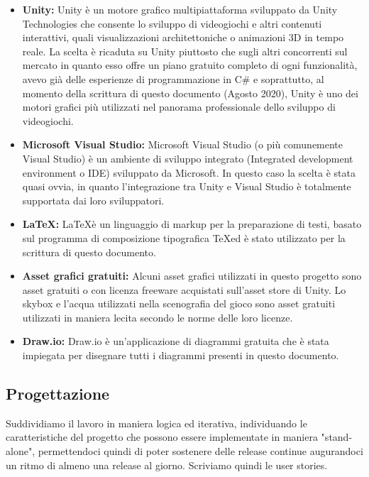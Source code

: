 \documentclass[12pt]{article}
\begin{document}
\begin{itemize}
\item{\textbf{Unity:}} Unity è un motore grafico multipiattaforma sviluppato da Unity Technologies che consente lo sviluppo di videogiochi e altri contenuti interattivi, quali visualizzazioni architettoniche o animazioni 3D in tempo reale. La scelta è ricaduta su Unity piuttosto che sugli altri concorrenti sul mercato in quanto esso offre un piano gratuito completo di ogni funzionalità, avevo già delle esperienze di programmazione in C\# e soprattutto, al momento della scrittura di questo documento (Agosto 2020), Unity è uno dei motori grafici più utilizzati nel panorama professionale dello sviluppo di videogiochi.
\item{\textbf{Microsoft Visual Studio:}} Microsoft Visual Studio (o più comunemente Visual Studio) è un ambiente di sviluppo integrato (Integrated development environment o IDE) sviluppato da Microsoft. In questo caso la scelta è stata quasi ovvia, in quanto l'integrazione tra Unity e Visual Studio è totalmente supportata dai loro sviluppatori.
\item{\textbf{\LaTeX:}} \LaTeX è un linguaggio di markup per la preparazione di testi, basato sul programma di composizione tipografica \TeX ed è stato utilizzato per la scrittura di questo documento.
\item{\textbf{Asset grafici gratuiti:}} Alcuni asset grafici utilizzati in questo progetto sono asset gratuiti o con licenza freeware acquistati sull'asset store di Unity. Lo skybox e l'acqua utilizzati nella scenografia del gioco sono asset gratuiti utilizzati in maniera lecita secondo le norme delle loro licenze.
\item{\textbf{Draw.io:}} Draw.io è un'applicazione di diagrammi gratuita che è stata impiegata per disegnare tutti i diagrammi presenti in questo documento.
\end{itemize}

\subsection{Progettazione}
Suddividiamo il lavoro in maniera logica ed iterativa, individuando le caratteristiche del progetto che possono essere implementate in maniera "stand-alone", permettendoci quindi di poter sostenere delle release continue augurandoci un ritmo di almeno una release al giorno. Scriviamo quindi le user stories.
\newline
\end{document}
